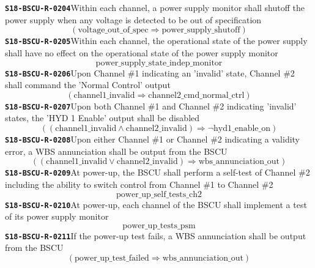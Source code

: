 \documentclass[11pt,a4paper]{article}
\begin{document}
\noindent\textbf{\texttt{S18-BSCU-R-0204}}\quad Within each channel, a power supply monitor shall shutoff the power supply when any voltage is detected to be out of specification
\begin{dmath*}
(\text{voltage\_out\_of\_spec} \Rightarrow \text{power\_supply\_shutoff})
\end{dmath*}
\noindent\textbf{\texttt{S18-BSCU-R-0205}}\quad Within each channel, the operational state of the power supply shall have no effect on the operational state of the power supply monitor
\begin{dmath*}
\text{power\_supply\_state\_indep\_monitor}
\end{dmath*}
\noindent\textbf{\texttt{S18-BSCU-R-0206}}\quad Upon Channel \#1 indicating an 'invalid' state, Channel \#2 shall command the 'Normal Control' output
\begin{dmath*}
(\text{channel1\_invalid} \Rightarrow \text{channel2\_cmd\_normal\_ctrl})
\end{dmath*}
\noindent\textbf{\texttt{S18-BSCU-R-0207}}\quad Upon both Channel \#1 and Channel \#2 indicating 'invalid' states, the 'HYD 1 Enable' output shall be disabled
\begin{dmath*}
((\text{channel1\_invalid} \wedge \text{channel2\_invalid}) \Rightarrow \neg \text{hyd1\_enable\_on})
\end{dmath*}
\noindent\textbf{\texttt{S18-BSCU-R-0208}}\quad Upon either Channel \#1 or Channel \#2 indicating a validity error, a WBS annunciation shall be output from the BSCU
\begin{dmath*}
((\text{channel1\_invalid} \vee \text{channel2\_invalid}) \Rightarrow \text{wbs\_annunciation\_out})
\end{dmath*}
\noindent\textbf{\texttt{S18-BSCU-R-0209}}\quad At power-up, the BSCU shall perform a self-test of Channel \#2 including the ability to switch control from Channel \#1 to Channel \#2
\begin{dmath*}
\text{power\_up\_self\_tests\_ch2}
\end{dmath*}
\noindent\textbf{\texttt{S18-BSCU-R-0210}}\quad At power-up, each channel of the BSCU shall implement a test of its power supply monitor
\begin{dmath*}
\text{power\_up\_tests\_psm}
\end{dmath*}
\noindent\textbf{\texttt{S18-BSCU-R-0211}}\quad If the power-up test fails, a WBS annunciation shall be output from the BSCU
\begin{dmath*}
(\text{power\_up\_test\_failed} \Rightarrow \text{wbs\_annunciation\_out})
\end{dmath*}
\end{document}

